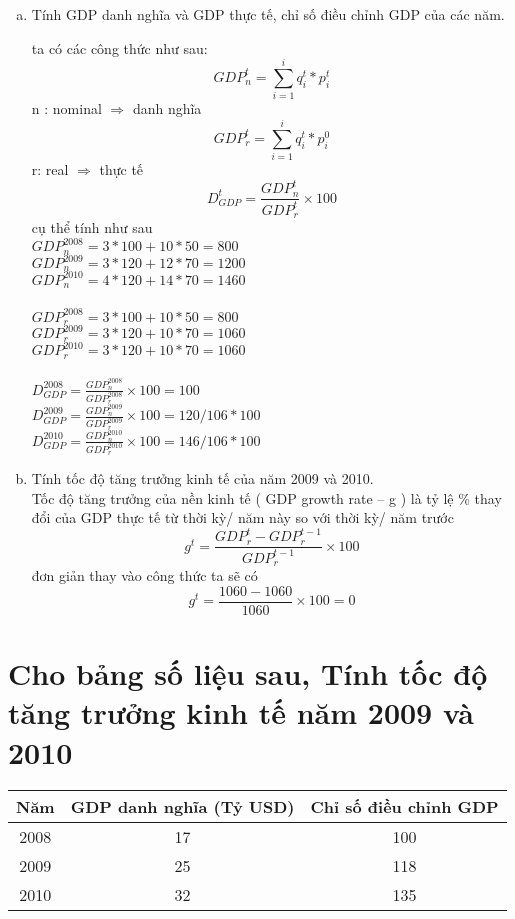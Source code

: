 \begin{enumerate}[a.]
  \item  Tính GDP danh nghĩa và GDP thực tế, chỉ số điều chỉnh GDP của các năm.

        ta có các công thức như sau:
        $$ GDP^t_n = \sum^{i}_{i = 1} q^t_i  * p^t_i $$
        n : nominal  $\Rightarrow$ danh nghĩa
        $$ GDP^t_r = \sum^{i}_{i = 1} q^t_i  * p^0_i $$
        r: real $\Rightarrow$ thực tế
        $$D^t_{GDP} = \frac{GDP^t_n}{GDP^t_r} \times 100$$
        cụ thể tính như sau\\
        $GDP^{2008}_n = 3 * 100 + 10 * 50 = 800$ \\
        $GDP^{2009}_n = 3 * 120 + 12 * 70 = 1200$ \\
        $GDP^{2010}_n = 4 * 120 + 14 * 70 = 1460$ \\
        \\
        $GDP^{2008}_r = 3 * 100 + 10 * 50 = 800$ \\
        $GDP^{2009}_r = 3 * 120 + 10 * 70 = 1060$ \\
        $GDP^{2010}_r = 3 * 120 + 10 * 70 = 1060$ \\
        \\
        $D^{2008}_{GDP} = \frac{GDP^{2008}_n}{GDP^{2008}_r} \times 100 = 100$ \\
        $D^{2009}_{GDP} = \frac{GDP^{2009}_n}{GDP^{2009}_r} \times 100 = 120/106 * 100$ \\
        $D^{2010}_{GDP} = \frac{GDP^{2010}_n}{GDP^{2010}_r} \times 100 = 146 / 106 * 100$ \\


  \item Tính tốc độ tăng trưởng kinh tế của năm 2009 và 2010. \\
        Tốc độ tăng trưởng của nền kinh tế ( GDP growth
        rate – g ) là tỷ lệ \% thay đổi của GDP thực tế từ thời
        kỳ/ năm này so với thời kỳ/ năm trước
        $$g^t = \frac{GDP^{t}_r - GDP^{t - 1}_r}{GDP^{t - 1}_r} \times 100  $$
        đơn giản thay vào công thức ta sẽ có 
        $$g^t = \frac{1060 - 1060}{1060} \times 100 = 0 $$
\end{enumerate}

\section{  Cho bảng số liệu sau, Tính tốc độ tăng trưởng kinh tế năm 2009 và 2010 }

\begin{tabular}{|c|c|c|}
  \hline
  Năm  & GDP danh nghĩa (Tỷ USD) & Chỉ số điều chỉnh GDP \\
  \hline
  2008 & 17                      & 100                   \\
  \hline
  2009 & 25                      & 118                   \\
  \hline
  2010 & 32                      & 135                   \\
  \hline
\end{tabular}

